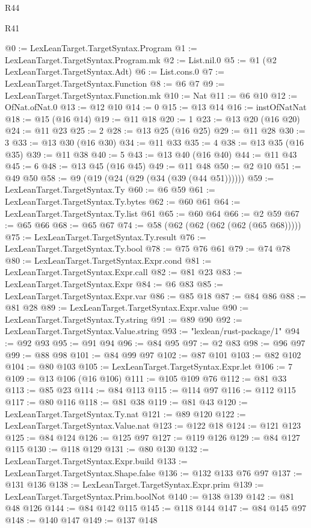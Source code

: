 \begin{lexlean}{R44}
\begin{lexlean}{R41}
\begin{coremodule}
{{{{{{{{{{{{{{{{{{{{{{{{{{{{{{{{{{{{{{{{{{{{{{{{{{{{{{{{{{{{{{{{{{{{{{{{{{{{{{{{{{{{{{{@0 := LexLeanTarget.TargetSyntax.Program
@1 := LexLeanTarget.TargetSyntax.Program.mk
@2 := List.nil.{0}
@5 := @1 (@2 LexLeanTarget.TargetSyntax.Adt)
@6 := List.cons.{0}
@7 := LexLeanTarget.TargetSyntax.Function
@8 := @6 @7
@9 := LexLeanTarget.TargetSyntax.Function.mk
@10 := Nat
@11 := @6 @10
@12 := OfNat.ofNat.{0}
@13 := @12 @10
@14 := 0
@15 := @13 @14
@16 := instOfNatNat
@18 := @15 (@16 @14)
@19 := @11 @18
@20 := 1
@23 := @13 @20 (@16 @20)
@24 := @11 @23
@25 := 2
@28 := @13 @25 (@16 @25)
@29 := @11 @28
@30 := 3
@33 := @13 @30 (@16 @30)
@34 := @11 @33
@35 := 4
@38 := @13 @35 (@16 @35)
@39 := @11 @38
@40 := 5
@43 := @13 @40 (@16 @40)
@44 := @11 @43
@45 := 6
@48 := @13 @45 (@16 @45)
@49 := @11 @48
@50 := @2 @10
@51 := @49 @50
@58 := @9 (@19 (@24 (@29 (@34 (@39 (@44 @51))))))
@59 := LexLeanTarget.TargetSyntax.Ty
@60 := @6 @59
@61 := LexLeanTarget.TargetSyntax.Ty.bytes
@62 := @60 @61
@64 := LexLeanTarget.TargetSyntax.Ty.list @61
@65 := @60 @64
@66 := @2 @59
@67 := @65 @66
@68 := @65 @67
@74 := @58 (@62 (@62 (@62 (@62 (@65 @68)))))
@75 := LexLeanTarget.TargetSyntax.Ty.result
@76 := LexLeanTarget.TargetSyntax.Ty.bool
@78 := @75 @76 @61
@79 := @74 @78
@80 := LexLeanTarget.TargetSyntax.Expr.cond
@81 := LexLeanTarget.TargetSyntax.Expr.call
@82 := @81 @23
@83 := LexLeanTarget.TargetSyntax.Expr
@84 := @6 @83
@85 := LexLeanTarget.TargetSyntax.Expr.var
@86 := @85 @18
@87 := @84 @86
@88 := @81 @28
@89 := LexLeanTarget.TargetSyntax.Expr.value
@90 := LexLeanTarget.TargetSyntax.Ty.string
@91 := @89 @90
@92 := LexLeanTarget.TargetSyntax.Value.string
@93 := "lexlean/rust-package/1"
@94 := @92 @93
@95 := @91 @94
@96 := @84 @95
@97 := @2 @83
@98 := @96 @97
@99 := @88 @98
@101 := @84 @99 @97
@102 := @87 @101
@103 := @82 @102
@104 := @80 @103
@105 := LexLeanTarget.TargetSyntax.Expr.let
@106 := 7
@109 := @13 @106 (@16 @106)
@111 := @105 @109 @76
@112 := @81 @33
@113 := @85 @23
@114 := @84 @113
@115 := @114 @97
@116 := @112 @115
@117 := @80 @116
@118 := @81 @38
@119 := @81 @43
@120 := LexLeanTarget.TargetSyntax.Ty.nat
@121 := @89 @120
@122 := LexLeanTarget.TargetSyntax.Value.nat
@123 := @122 @18
@124 := @121 @123
@125 := @84 @124
@126 := @125 @97
@127 := @119 @126
@129 := @84 @127 @115
@130 := @118 @129
@131 := @80 @130
@132 := LexLeanTarget.TargetSyntax.Expr.build
@133 := LexLeanTarget.TargetSyntax.Shape.false
@136 := @132 @133 @76 @97
@137 := @131 @136
@138 := LexLeanTarget.TargetSyntax.Expr.prim
@139 := LexLeanTarget.TargetSyntax.Prim.boolNot
@140 := @138 @139
@142 := @81 @48 @126
@144 := @84 @142 @115
@145 := @118 @144
@147 := @84 @145 @97
@148 := @140 @147
@149 := @137 @148
}}}}}}}}}}}}}}}}}}}}}}}}}}}}}}}}}}}}}}}}}}}}}}}}}}}}}}}}}}}}}}}}}}}}}}}}}}}}}}}}}}}}}}}
\end{coremodule}
\end{lexlean}
\end{lexlean}
